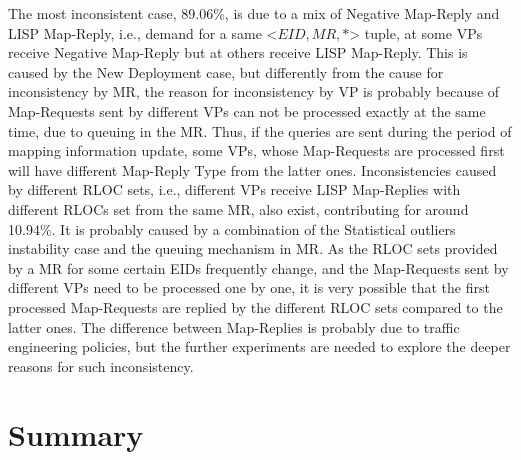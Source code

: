 The most inconsistent case, 89.06\%, is due to a mix of Negative Map-Reply and LISP Map-Reply, i.e., demand for a same <$EID, MR, *$> tuple, at some VPs receive Negative Map-Reply but at others receive LISP Map-Reply. This is caused by the New Deployment case, but differently from the cause for inconsistency by MR, the reason for inconsistency by VP is probably because of Map-Requests sent by different VPs can not be processed exactly at the same time, due to queuing in the MR. Thus, if the queries are sent during the period of mapping information update, some VPs, whose Map-Requests are processed first will have different Map-Reply Type from the latter ones. Inconsistencies caused by different RLOC sets, i.e., different VPs receive LISP Map-Replies with different RLOCs set from the same MR, also exist, contributing for around 10.94\%. It is probably caused by a combination of the Statistical outliers instability case and the queuing mechanism in MR. As the RLOC sets provided by a MR for some certain EIDs frequently change, and the Map-Requests sent by different VPs need to be processed one by one, it is very possible that the first processed Map-Requests are replied by the different RLOC sets compared to the latter ones. The difference between Map-Replies is probably due to traffic engineering policies, but the further experiments are needed to explore the deeper reasons for such inconsistency.



\section{Summary}
\label{sec:mds_conclusion}

